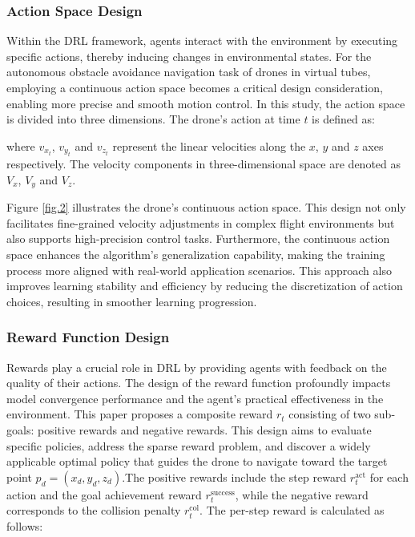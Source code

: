 \documentclass[preprint,12pt,authoryear]{elsarticle}
\begin{document}
\subsubsection{Action Space Design}

Within the DRL framework, agents interact with the environment by executing specific actions, thereby inducing changes in environmental states. For the autonomous obstacle avoidance navigation task of drones in virtual tubes, employing a continuous action space becomes a critical design consideration, enabling more precise and smooth motion control. In this study, the action space is divided into three dimensions. The drone's action at time \( t \) is defined as:


where \( v_{x_t} \), \( v_{y_t} \) and \( v_{z_t} \) represent the linear velocities along the \( x \), \( y \) and \( z \) axes respectively. The velocity components in three-dimensional space are denoted as \( V_x \), \( V_y \) and \( V_z \).


Figure \ref{fig.2} illustrates the drone's continuous action space. This design not only facilitates fine-grained velocity adjustments in complex flight environments but also supports high-precision control tasks. Furthermore, the continuous action space enhances the algorithm's generalization capability, making the training process more aligned with real-world application scenarios. This approach also improves learning stability and efficiency by reducing the discretization of action choices, resulting in smoother learning progression.


\subsubsection{Reward Function Design}

Rewards play a crucial role in DRL by providing agents with feedback on the quality of their actions. The design of the reward function profoundly impacts model convergence performance and the agent's practical effectiveness in the environment. This paper proposes a composite reward \( r_t \) consisting of two sub-goals: positive rewards and negative rewards. This design aims to evaluate specific policies, address the sparse reward problem, and discover a widely applicable optimal policy that guides the drone to navigate toward the target point \( p_d = (x_d, y_d, z_d) \).The positive rewards include the step reward \( r_{t}^{\text{act}} \) for each action and the goal achievement reward \( r_{t}^{\text{success}} \), while the negative reward corresponds to the collision penalty \( r_{t}^{\text{col}} \). The per-step reward is calculated as follows:
\end{document}
